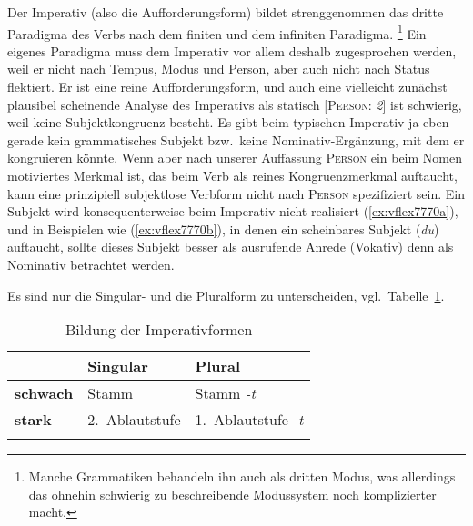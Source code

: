 Der Imperativ (also die Aufforderungsform) bildet strenggenommen das dritte Paradigma des Verbs nach dem finiten und dem infiniten Paradigma.%
\footnote{Manche Grammatiken behandeln ihn auch als dritten Modus, was allerdings das ohnehin schwierig zu beschreibende Modussystem noch komplizierter macht.}
Ein eigenes Paradigma muss dem Imperativ vor allem deshalb zugesprochen werden, weil er nicht nach Tempus, Modus und Person, aber auch nicht nach Status flektiert.
Er ist eine reine Aufforderungsform, und auch eine vielleicht zunächst plausibel scheinende Analyse des Imperativs als statisch [\textsc{Person}: \textit{2}] ist schwierig, weil keine Subjektkongruenz besteht.
Es gibt beim typischen Imperativ ja eben gerade kein grammatisches Subjekt bzw.\ keine Nominativ-Ergänzung, mit dem er kongruieren könnte.
Wenn aber nach unserer Auffassung \textsc{Person} ein beim Nomen motiviertes Merkmal ist, das beim Verb als reines Kongruenzmerkmal auftaucht, kann eine prinzipiell subjektlose Verbform nicht nach \textsc{Person} spezifiziert sein.
Ein Subjekt wird konsequenterweise beim Imperativ nicht realisiert (\ref{ex:vflex7770a}), und in Beispielen wie (\ref{ex:vflex7770b}), in denen ein scheinbares Subjekt (\textit{du}) auftaucht, sollte dieses Subjekt besser als ausrufende Anrede (Vokativ) denn als Nominativ betrachtet werden.

\begin{exe}
  \ex\label{ex:vflex7770}
  \begin{xlist}
  \end{xlist}
\end{exe}

Es sind nur die Singular- und die Pluralform zu unterscheiden, vgl.\ Tabelle~\ref{tab:imp}.


\begin{table}
  \centering
  \begin{tabular}{lll}
    \lsptoprule
    & \textbf{Singular} & \textbf{Plural} \\
    \midrule
    \textbf{schwach} & Stamm & Stamm \textit{-t} \\
    \textbf{stark} & 2.~Ablautstufe & 1.~Ablautstufe \textit{-t} \\
    \lspbottomrule
  \end{tabular}
  \caption{Bildung der Imperativformen}
  \label{tab:imp}
\end{table}

